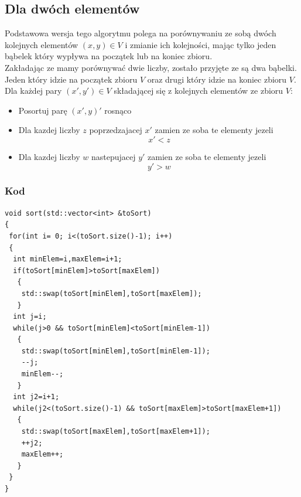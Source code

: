 \subsection{Dla dwóch elementów}
Podstawowa wersja tego algorytmu polega na porównywaniu ze sobą dwóch kolejnych elementów $(x,y) \in V$ i zmianie ich kolejności, mając tylko jeden bąbelek który wypływa na początek lub na koniec zbioru. \\
Zakładając ze mamy porównywać dwie liczby, zostało przyjęte ze są dwa bąbelki. Jeden który idzie na początek zbioru  $V$ oraz drugi który idzie na koniec zbioru $V$. \\
Dla każdej pary $(x',y') \in V$ składającej się z kolejnych elementów ze zbioru $V$:
\begin{itemize} 
\item Posortuj parę $(x',y)'$ rosnąco
\item Dla kazdej liczby $z$ poprzedzajacej $x'$ zamien ze soba te elementy jezeli\begin{equation*}x' < z\end{equation*} 
\item  Dla kazdej liczby $w$ nastepujacej $y'$ zamien ze soba te elementy jezeli \begin{equation*}y'>w\end{equation*}
 \end{itemize}  
\subsubsection*{Kod}

\begin{lstlisting}
void sort(std::vector<int> &toSort)
{
 for(int i= 0; i<(toSort.size()-1); i++)
 {
  int minElem=i,maxElem=i+1;
  if(toSort[minElem]>toSort[maxElem])
   {
    std::swap(toSort[minElem],toSort[maxElem]);
   }
  int j=i;
  while(j>0 && toSort[minElem]<toSort[minElem-1])
   {
    std::swap(toSort[minElem],toSort[minElem-1]);
    --j;
    minElem--;
   }
  int j2=i+1;
  while(j2<(toSort.size()-1) && toSort[maxElem]>toSort[maxElem+1])
   {
    std::swap(toSort[maxElem],toSort[maxElem+1]);
    ++j2;
    maxElem++;
   } 
 }
}
\end{lstlisting}
